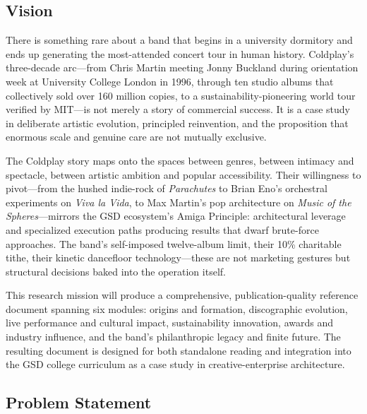 \documentclass[11pt,letterpaper]{article}
\begin{document}
\subsection{Vision}

There is something rare about a band that begins in a university dormitory and ends up generating the most-attended concert tour in human history. Coldplay's three-decade arc---from Chris Martin meeting Jonny Buckland during orientation week at University College London in 1996, through ten studio albums that collectively sold over 160 million copies, to a sustainability-pioneering world tour verified by MIT---is not merely a story of commercial success. It is a case study in deliberate artistic evolution, principled reinvention, and the proposition that enormous scale and genuine care are not mutually exclusive.

The Coldplay story maps onto the spaces between genres, between intimacy and spectacle, between artistic ambition and popular accessibility. Their willingness to pivot---from the hushed indie-rock of \textit{Parachutes} to Brian Eno's orchestral experiments on \textit{Viva la Vida}, to Max Martin's pop architecture on \textit{Music of the Spheres}---mirrors the GSD ecosystem's Amiga Principle: architectural leverage and specialized execution paths producing results that dwarf brute-force approaches. The band's self-imposed twelve-album limit, their 10\% charitable tithe, their kinetic dancefloor technology---these are not marketing gestures but structural decisions baked into the operation itself.

This research mission will produce a comprehensive, publication-quality reference document spanning six modules: origins and formation, discographic evolution, live performance and cultural impact, sustainability innovation, awards and industry influence, and the band's philanthropic legacy and finite future. The resulting document is designed for both standalone reading and integration into the GSD college curriculum as a case study in creative-enterprise architecture.

\subsection{Problem Statement}
\end{document}
